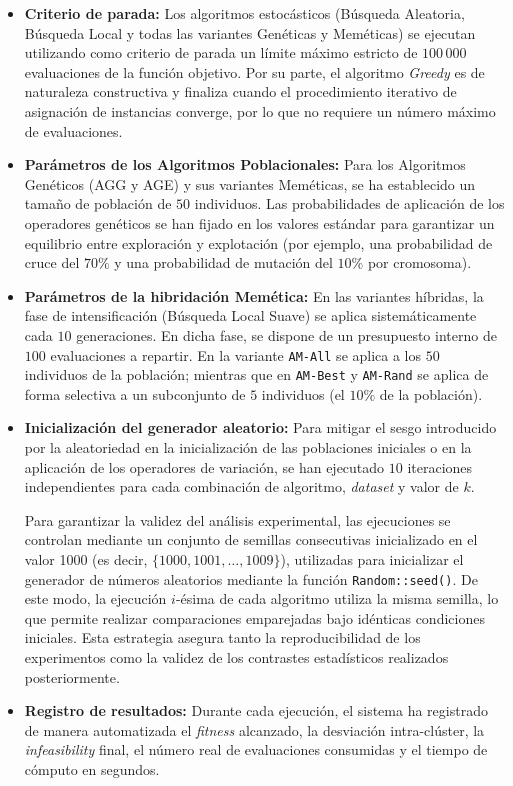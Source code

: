 \documentclass[a4paper,12pt]{article}%
\begin{document}
\begin{itemize}
	\item \textbf{Criterio de parada:} Los algoritmos estocásticos (Búsqueda Aleatoria, Búsqueda Local y todas las variantes Genéticas y Meméticas) se ejecutan utilizando como criterio de parada un límite máximo estricto de $100\,000$ evaluaciones de la función objetivo. Por su parte, el algoritmo \textit{Greedy} es de naturaleza constructiva y finaliza cuando el procedimiento iterativo de asignación de instancias converge, por lo que no requiere un número máximo de evaluaciones.
	
	\item \textbf{Parámetros de los Algoritmos Poblacionales:} Para los Algoritmos Genéticos (AGG y AGE) y sus variantes Meméticas, se ha establecido un tamaño de población de $50$ individuos. Las probabilidades de aplicación de los operadores genéticos se han fijado en los valores estándar para garantizar un equilibrio entre exploración y explotación (por ejemplo, una probabilidad de cruce del $70\%$ y una probabilidad de mutación del $10\%$ por cromosoma).
	
	\item \textbf{Parámetros de la hibridación Memética:} En las variantes híbridas, la fase de intensificación (Búsqueda Local Suave) se aplica sistemáticamente cada $10$ generaciones. En dicha fase, se dispone de un presupuesto interno de $100$ evaluaciones a repartir. En la variante \texttt{AM-All} se aplica a los $50$ individuos de la población; mientras que en \texttt{AM-Best} y \texttt{AM-Rand} se aplica de forma selectiva a un subconjunto de $5$ individuos (el $10\%$ de la población).
	
	\item \textbf{Inicialización del generador aleatorio:} Para mitigar el sesgo introducido por la aleatoriedad en la inicialización de las poblaciones iniciales o en la aplicación de los operadores de variación, se han ejecutado $10$ iteraciones independientes para cada combinación de algoritmo, \textit{dataset} y valor de $k$. 
	
	Para garantizar la validez del análisis experimental, las ejecuciones se controlan mediante un conjunto de semillas consecutivas inicializado en el valor 1000 (es decir, $\{1000, 1001, \dots, 1009\}$), utilizadas para inicializar el generador de números aleatorios mediante la función \texttt{Random::seed()}. De este modo, la ejecución $i$-ésima de cada algoritmo utiliza la misma semilla, lo que permite realizar comparaciones emparejadas bajo idénticas condiciones iniciales. Esta estrategia asegura tanto la reproducibilidad de los experimentos como la validez de los contrastes estadísticos realizados posteriormente.	
	
	\item \textbf{Registro de resultados:} Durante cada ejecución, el sistema ha registrado de manera automatizada el \textit{fitness} alcanzado, la desviación intra-clúster, la \textit{infeasibility} final, el número real de evaluaciones consumidas y el tiempo de cómputo en segundos.
\end{itemize}
\end{document}

